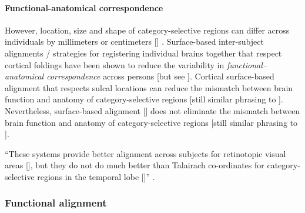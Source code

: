 \paragraph{Functional-anatomical correspondence}


However, location, size and shape of category-selective regions can differ
across individuals by millimeters or centimeters [\citep{zhen2017quantifying,
zhen2015quantifying}] \citep{feilong2018reliable}.
%
Surface-based inter-subject alignments / strategies for registering individual
brains together that respect cortical foldings \citep{fischl1999cortical,
yeo2009spherical} have been shown to reduce the variability in
\textit{functional--anatomical correspondence} \citep{feilong2018reliable,
kumar2020brainiak} across persons \citep{klein2010evaluation,
frost2012measuring} [but see \citep{langers2014assessment}].
%
Cortical surface-based alignment \citep{fischl2012freesurfer} that respects
sulcal locations can reduce the mismatch between brain function and anatomy of
category-selective regions \citep{duncan2009consistency, frost2012measuring,
weiner2018defining, weiner2014mid} [still similar phrasing to
\citep{feilong2018reliable}].
%
Nevertheless, surface-based alignment [\citep{fischl2012freesurfer}] does not
eliminate the mismatch between brain function and anatomy of category-selective
regions \citep{duncan2009consistency, frost2012measuring, weiner2018defining,
weiner2014mid}[still similar phrasing to \citep{feilong2018reliable}].

%
``These systems provide better alignment across subjects for retinotopic visual
areas [\citep{fischl1999high}], but they do not do much better than Talairach
co-ordinates for category-selective regions in the temporal lobe
[\citep{spiridon2006location}]'' \citep{saxe2006divide}.


\subsubsection{Functional alignment}


